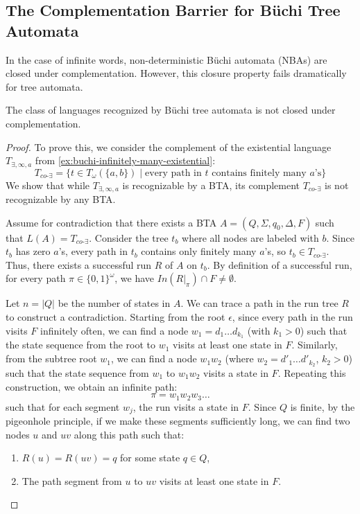 \subsection{The Complementation Barrier for Büchi Tree Automata}
In the case of infinite words, non-deterministic Büchi automata (NBAs) are closed under complementation. However, this closure property fails dramatically for tree automata.

\begin{theorem}
The class of languages recognized by Büchi tree automata is not closed under complementation.
\end{theorem}

\begin{proof}
To prove this, we consider the complement of the existential language $T_{\exists, \infty, a}$ from \cref{ex:buchi-infinitely-many-existential}:
$$T_{co\text{-}\exists} = \{ t \in T_\omega(\{a,b\}) \mid \text{every path in } t \text{ contains finitely many } a\text{'s} \}$$
We show that while $T_{\exists, \infty, a}$ is recognizable by a BTA, its complement $T_{co\text{-}\exists}$ is not recognizable by any BTA.

Assume for contradiction that there exists a BTA $A = (Q, \Sigma, q_0, \Delta, F)$ such that $L(A) = T_{co\text{-}\exists}$.
Consider the tree $t_b$ where all nodes are labeled with $b$. Since $t_b$ has zero $a$'s, every path in $t_b$ contains only finitely many $a$'s, so $t_b \in T_{co\text{-}\exists}$. Thus, there exists a successful run $R$ of $A$ on $t_b$.
By definition of a successful run, for every path $\pi \in \{0,1\}^\omega$, we have $In(R|_\pi) \cap F \neq \emptyset$.

Let $n = |Q|$ be the number of states in $A$. We can trace a path in the run tree $R$ to construct a contradiction.
Starting from the root $\epsilon$, since every path in the run visits $F$ infinitely often, we can find a node $w_1 = d_1 \dots d_{k_1}$ (with $k_1 > 0$) such that the state sequence from the root to $w_1$ visits at least one state in $F$.
Similarly, from the subtree root $w_1$, we can find a node $w_1 w_2$ (where $w_2 = d'_{1} \dots d'_{k_2}$, $k_2 > 0$) such that the state sequence from $w_1$ to $w_1 w_2$ visits a state in $F$.
Repeating this construction, we obtain an infinite path:
$$\pi = w_1 w_2 w_3 \dots$$
such that for each segment $w_j$, the run visits a state in $F$.
Since $Q$ is finite, by the pigeonhole principle, if we make these segments sufficiently long, we can find two nodes $u$ and $uv$ along this path such that:
\begin{enumerate}
    \item $R(u) = R(uv) = q$ for some state $q \in Q$,
    \item The path segment from $u$ to $uv$ visits at least one state in $F$.
\end{enumerate}


\end{proof}
